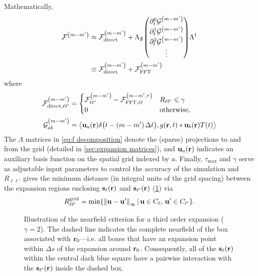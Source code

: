 Mathematically,
\begin{equation}
  \begin{aligned}
    \mathcal{F}^\qty(m - m') & \approx \mathcal{F}^\qty(m-m')_\text{direct} + \Lambda_\mathfrak{F} \mqty(\partial_t^0 \mathcal{G}^\qty(m-m') \\ \partial_t^1 \mathcal{G}^\qty(m-m') \\ \partial_t^2 \mathcal{G}^\qty(m-m') \\ \vdots) \Lambda^\dagger \\
                             & \equiv \mathcal{F}^\qty(m-m')_\text{direct} + \mathcal{F}^\qty(m-m')_\text{FFT}
    \end{aligned}
  \label{eq:f decomposition}
\end{equation}
where
\begin{subequations}
  \begin{align}
    \mathcal{F}^\qty(m-m')_{\text{direct},\ell\ell'} &= \begin{cases}
      \mathcal{F}^\qty(m-m')_{\ell\ell'}  - \mathcal{F}^\qty(m-m',\tau)_{\text{FFT},\ell\ell} & R_{\ell\ell'} \leqslant \gamma \\
      0 & \text{otherwise},
    \end{cases} \\
    \mathcal{G}^\qty(m-m')_{ab} &= \left< \vb{u}_a(\vb{r})\delta\qty\big(t - (m-m')\, \Delta t), g(\vb{r}, t) \ast \vb{u}_{b}(\vb{r})T(t) \right>
  \end{align}
  \label{eq:decomposition elements}
\end{subequations}
The $\Lambda$ matrices in \cref{eq:f decomposition} denote the (sparse) projections to and from the grid (detailed in \cref{sec:expansion matrices}), and $\vb{u}_a(\vb{r})$ indicates an auxiliary basis function on the spatial grid indexed by $a$.
Finally, $\tau_\text{max}$ and $\gamma$ serve as adjustable input parameters to control the accuracy of the simulation and $R_{\ell\ell'}$ gives the minimum distance (in integral units of the grid spacing) between the expansion regions enclosing $\vb{s}_\ell(\vb{r})$ and $\vb{s}_{\ell'}(\vb{r})$ (\cref{fig:nearfield criterion}) via
\begin{equation}
  R^\text{grid}_{\ell\ell'} = \min\!\qty{\norm{\vb{u} - \vb{u}'}_\infty \, | \, \vb{u} \in C_\ell, \, \vb{u}' \in C_{\ell'}}.
\end{equation}

\begin{figure}
  \centering
  \caption{\label{fig:nearfield criterion}Illustration of the nearfield criterion for a third order expansion ($\gamma = 2$).
    The dashed line indicates the complete nearfield of the box associated with \textcolor{cbblue}{$\vb{r}_0$}---i.e. all boxes that have an expansion point within $\Delta s$ of the expansion around \textcolor{cbblue}{$\vb{r}_0$}.
    Consequently, all of the $\vb{s}_\ell(\vb{r})$ within the central dark blue square have a pairwise interaction with the $\vb{s}_{\ell'}(\vb{r})$ inside the dashed box.
  }
\end{figure}

